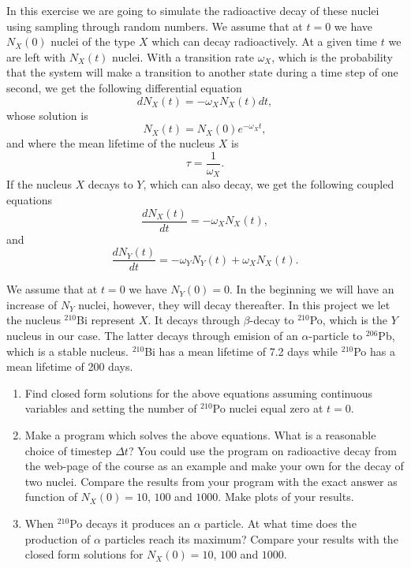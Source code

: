 \begin{prob}
In this exercise we are going to simulate the radioactive decay
of these nuclei using sampling through random numbers.
We assume that at $t=0$ we have  $N_X(0)$ nuclei of the type $X$
which can decay radioactively. At a given time  
$t$ we are left with 
$N_X(t)$ nuclei. With a transition rate $\omega_X$, 
which is the probability that the system will make a transition to another 
state during a time step of one second, we get the following differential equation
\[
   dN_X(t)=-\omega_X N_X(t)dt,
\]
whose solution is
\[
   N_X(t)=N_X(0)e^{-\omega_X t},
\]
and where the mean lifetime of the nucleus $X$ is
\[
   \tau =\frac{1}{\omega_X}.
\]
If the nucleus $X$ decays to  $Y$, which can also decay,
we get the following coupled equations
\[
   \frac{dN_X(t)}{dt}=-\omega_XN_X(t),
\]
and
\[
   \frac{dN_Y(t)}{dt}=-\omega_YN_Y(t)+\omega_XN_X(t).
\]

We assume that at  $t=0$ we have $N_Y(0)=0$. 
In the beginning 
we will have an increase of $N_Y$ nuclei, however, they will decay thereafter.
In this project we let the nucleus $^{210}$Bi represent $X$. It decays 
through $\beta$-decay to $^{210}$Po, which is the $Y$ nucleus in our case. 
The latter decays through emision of an $\alpha$-particle to
$^{206}$Pb, which is a stable nucleus.
$^{210}$Bi has a mean lifetime of  7.2 days while $^{210}$Po 
has a mean lifetime of  200 days. 

\begin{enumerate}
\item Find closed form solutions for the above equations assuming 
continuous variables and setting the number of 
$^{210}$Po nuclei equal zero at $t=0$.
\item Make a program which solves the above equations.
What is a reasonable choice of timestep $\Delta t$? 
You could use the program on radioactive decay from the web-page of the 
course as
an example and make your own for the decay of two nuclei.
Compare the results from your program with the exact answer as function
of $N_X(0)=10$, $100$
and  $1000$. Make plots of your results.
\item When $^{210}$Po decays it produces an $\alpha$
particle. At what time does the  production of $\alpha$ 
particles reach its maximum? Compare your results with the closed form solutions
for 
$N_X(0)=10$, $100$
and  $1000$. 
\end{enumerate}
\end{prob}

